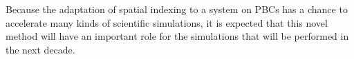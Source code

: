 \documentclass[10pt,letterpaper,twocolumn]{article}
\begin{document}
Because the adaptation of spatial indexing to a system on PBCs has a chance to
accelerate many kinds of scientific simulations, it is expected that this novel
method will have an important role for the simulations that will be performed in
the next decade.


{}


%
%
\end{document}
